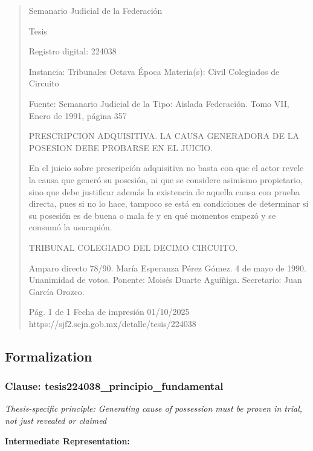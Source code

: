 \documentclass[11pt,a4paper]{article}
\begin{document}
\begin{quote}
                                                   Semanario Judicial de la Federación

                                                  Tesis

 Registro digital: 224038

 Instancia: Tribunales            Octava Época                         Materia(s): Civil
 Colegiados de Circuito

                                  Fuente: Semanario Judicial de la     Tipo: Aislada
                                  Federación.
                                  Tomo VII, Enero de 1991, página
                                  357


PRESCRIPCION ADQUISITIVA. LA CAUSA GENERADORA DE LA POSESION DEBE
PROBARSE EN EL JUICIO.


En el juicio sobre prescripción adquisitiva no basta con que el actor revele la causa que generó su
posesión, ni que se considere asimismo propietario, sino que debe justificar además la existencia de
aquella causa con prueba directa, pues si no lo hace, tampoco se está en condiciones de
determinar si su posesión es de buena o mala fe y en qué momentos empezó y se consumó la
usucapión.

TRIBUNAL COLEGIADO DEL DECIMO CIRCUITO.


Amparo directo 78/90. María Esperanza Pérez Gómez. 4 de mayo de 1990. Unanimidad de votos.
Ponente: Moisés Duarte Aguíñiga. Secretario: Juan García Orozco.




                                             Pág. 1 de 1             Fecha de impresión 01/10/2025
  https://sjf2.scjn.gob.mx/detalle/tesis/224038

\end{quote}

\subsection{Formalization}

\subsubsection{Clause: tesis224038\_principio\_fundamental}

\textit{Thesis-specific principle: Generating cause of possession must be proven in trial, not just revealed or claimed}

\textbf{Intermediate Representation:}
\end{document}
